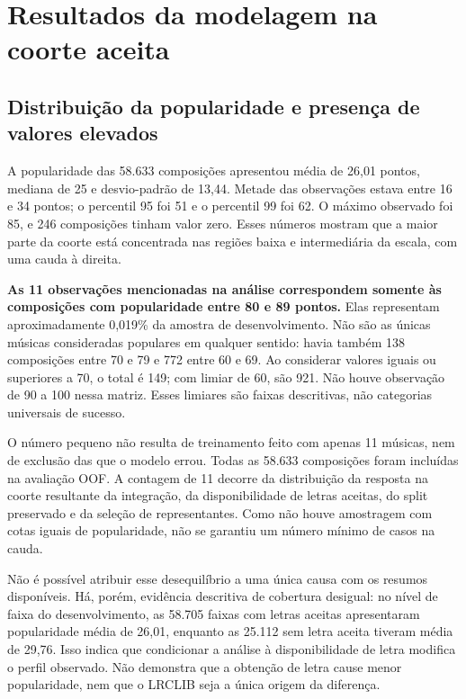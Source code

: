 \section{Resultados da modelagem na coorte aceita}
\label{sec:resultados}

\subsection{Distribuição da popularidade e presença de valores elevados}

A popularidade das 58.633 composições apresentou média de 26,01 pontos, mediana de 25 e desvio-padrão de 13,44. Metade das observações estava entre 16 e 34 pontos; o percentil 95 foi 51 e o percentil 99 foi 62. O máximo observado foi 85, e 246 composições tinham valor zero. Esses números mostram que a maior parte da coorte está concentrada nas regiões baixa e intermediária da escala, com uma cauda à direita.



\textbf{As 11 observações mencionadas na análise correspondem somente às composições com popularidade entre 80 e 89 pontos.} Elas representam aproximadamente 0,019\% da amostra de desenvolvimento. Não são as únicas músicas consideradas populares em qualquer sentido: havia também 138 composições entre 70 e 79 e 772 entre 60 e 69. Ao considerar valores iguais ou superiores a 70, o total é 149; com limiar de 60, são 921. Não houve observação de 90 a 100 nessa matriz. Esses limiares são faixas descritivas, não categorias universais de sucesso.

O número pequeno não resulta de treinamento feito com apenas 11 músicas, nem de exclusão das que o modelo errou. Todas as 58.633 composições foram incluídas na avaliação OOF. A contagem de 11 decorre da distribuição da resposta na coorte resultante da integração, da disponibilidade de letras aceitas, do split preservado e da seleção de representantes. Como não houve amostragem com cotas iguais de popularidade, não se garantiu um número mínimo de casos na cauda.

Não é possível atribuir esse desequilíbrio a uma única causa com os resumos disponíveis. Há, porém, evidência descritiva de cobertura desigual: no nível de faixa do desenvolvimento, as 58.705 faixas com letras aceitas apresentaram popularidade média de 26,01, enquanto as 25.112 sem letra aceita tiveram média de 29,76. Isso indica que condicionar a análise à disponibilidade de letra modifica o perfil observado. Não demonstra que a obtenção de letra cause menor popularidade, nem que o LRCLIB seja a única origem da diferença.

